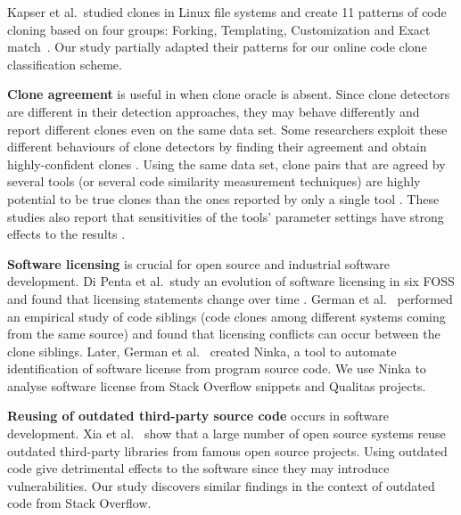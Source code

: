 \documentclass[sigconf,review, anonymous]{acmart}
\begin{document}
Kapser et al.~studied clones in Linux file systems and create 11 patterns of code cloning based on four groups: Forking, Templating, Customization and Exact match~\cite{Kapser2003,Kapser2008}. Our study partially adapted their patterns for our online code clone classification scheme.

\textbf{Clone agreement} is useful in when clone oracle is absent. Since clone detectors are different in their detection approaches, they may behave differently and report different clones even on the same data set. Some researchers exploit these different behaviours of clone detectors by finding their agreement and obtain highly-confident clones \cite{Bellon2007,Wang2013}. Using the same data set, clone pairs that are agreed by several tools (or several code similarity measurement techniques) are highly potential to be true clones than the ones reported by only a single tool \cite{Wang2013,cr2016ssbse,Funaro2010}. These studies also report that sensitivities of the tools' parameter settings have strong effects to the results \cite{Wang2013,cr2016ssbse}.

\textbf{Software licensing} is crucial for open source and industrial software development. Di Penta et al.~study an evolution of software licensing in six FOSS and found that licensing statements change over time \cite{DiPenta2010}. German et al.~\cite{German2009} performed an empirical study of code siblings (code clones among different systems coming from the same source) and found that licensing conflicts can occur between the clone siblings. Later, German et al.~\cite{German2010} created Ninka, a tool to automate identification of software license from program source code. We use Ninka to analyse software license from Stack Overflow snippets and Qualitas projects. 

\textbf{Reusing of outdated third-party source code} occurs in software development. Xia et al.~\cite{Xia2014} show that a large number of open source systems reuse outdated third-party libraries from famous open source projects. Using outdated code give detrimental effects to the software since they may introduce vulnerabilities. Our study discovers similar findings in the context of outdated code from Stack Overflow.
\end{document}

